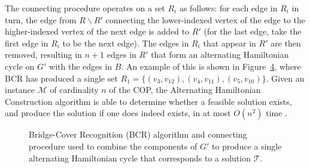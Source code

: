 \documentclass{elsarticle}
\begin{document}
The connecting procedure operates on a set $R_i$ as follows: for each edge in $R_i$ in turn, the edge from $R \backslash R'$ connecting the lower-indexed vertex of the edge to the higher-indexed vertex of the next edge is added to $R'$ (for the last edge, take the first edge in $R_i$ to be the next edge). The edges in $R_i$ that appear in $R'$ are then removed, resulting in $n+1$ edges in $R'$ that form an alternating Hamiltonian cycle on $G'$ with the edges in $B$. An example of this is shown in Figure~\ref{fig:br}, where BCR has produced a single set $R_1 = \{(v_3, v_{12}),(v_4, v_{11}), (v_5, v_{10})\}$. Given an instance $\mathcal{M}$ of cardinality $n$ of the COP, the Alternating Hamiltonian Construction algorithm is able to determine whether a feasible solution exists, and produce the solution if one does indeed exists, in at most $O(n^2)$ time \cite{hawa2018}.

\begin{figure}[H]	
	\centering
	\begin{subfigure}[h]{0.35\textwidth}
		
		\label{fig:mbrlist}
	\end{subfigure} \hspace{7mm} %
	\begin{subfigure}[h]{0.25\textwidth}
		
		\label{fig:mpsconnect}
	\end{subfigure} \hspace{7mm} %
	\begin{subfigure}[h]{0.25\textwidth}
		
		\label{fig:mpscycle}
	\end{subfigure}
	\caption{Bridge-Cover Recognition (BCR) algorithm and connecting procedure used to combine the components of $G'$ to produce a single alternating Hamiltonian cycle that corresponds to a solution $\mathcal{T}$.}
	\label{fig:br}
\end{figure}
\end{document}
